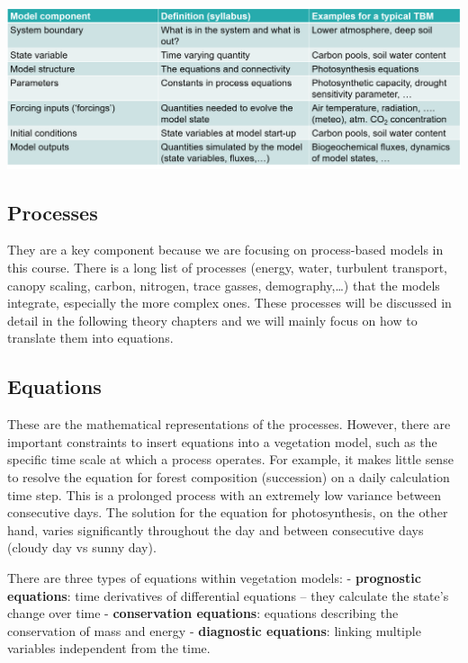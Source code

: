 \documentclass[12pt,oneside]{book}
\begin{document}
\begin{center}
\label{table:components}

\begin{center}\includegraphics[width=0.9\linewidth]{figures/chap1/table_components} \end{center}
\end{center}

\subsection{Processes}\label{processes}

They are a key component because we are focusing on process-based models
in this course. There is a long list of processes (energy, water,
turbulent transport, canopy scaling, carbon, nitrogen, trace gasses,
demography,\ldots{}) that the models integrate, especially the more
complex ones. These processes will be discussed in detail in the
following theory chapters and we will mainly focus on how to translate
them into equations.

\subsection{Equations}\label{equations}

These are the mathematical representations of the processes. However,
there are important constraints to insert equations into a vegetation
model, such as the specific time scale at which a process operates. For
example, it makes little sense to resolve the equation for forest
composition (succession) on a daily calculation time step. This is a
prolonged process with an extremely low variance between consecutive
days. The solution for the equation for photosynthesis, on the other
hand, varies significantly throughout the day and between consecutive
days (cloudy day vs sunny day).

There are three types of equations within vegetation models: -
\textbf{prognostic equations}: time derivatives of differential
equations -- they calculate the state's change over time -
\textbf{conservation equations}: equations describing the conservation
of mass and energy - \textbf{diagnostic equations}: linking multiple
variables independent from the time.
\end{document}
